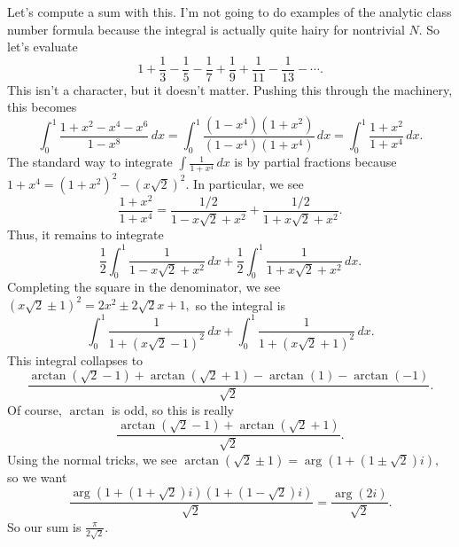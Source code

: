 Let's compute a sum with this. I'm not going to do examples of the analytic class number formula because the integral is actually quite hairy for nontrivial $N.$ So let's evaluate
\[1+\frac13-\frac15-\frac17+\frac19+\frac1{11}-\frac1{13}-\cdots.\]
This isn't a character, but it doesn't matter. Pushing this through the machinery, this becomes
\[\int_0^1\frac{1+x^2-x^4-x^6}{1-x^8}\,dx=\int_0^1\frac{\left(1-x^4\right)\left(1+x^2\right)}{\left(1-x^4\right)\left(1+x^4\right)}\,dx=\int_0^1\frac{1+x^2}{1+x^4}\,dx.\]
The standard way to integrate $\int\frac1{1+x^4}\,dx$ is by partial fractions because $1+x^4=\left(1+x^2\right)^2-\left(x\sqrt2\right)^2.$ In particular, we see
\[\frac{1+x^2}{1+x^4}=\frac{1/2}{1-x\sqrt2+x^2}+\frac{1/2}{1+x\sqrt2+x^2}.\]
Thus, it remains to integrate
\[\frac12\int_0^1\frac1{1-x\sqrt2+x^2}\,dx+\frac12\int_0^1\frac1{1+x\sqrt2+x^2}\,dx.\]
Completing the square in the denominator, we see $(x\sqrt2\pm1)^2=2x^2\pm2\sqrt2x+1,$ so the integral is
\[\int_0^1\frac1{1+(x\sqrt2-1)^2}\,dx+\int_0^1\frac1{1+(x\sqrt2+1)^2}\,dx.\]
This integral collapses to
\[\frac{\arctan(\sqrt2-1)+\arctan(\sqrt2+1)-\arctan(1)-\arctan(-1)}{\sqrt2}.\]
Of course, $\arctan$ is odd, so this is really
\[\frac{\arctan(\sqrt2-1)+\arctan(\sqrt2+1)}{\sqrt2}.\]
Using the normal tricks, we see $\arctan(\sqrt2\pm1)=\arg\left(1+(1\pm\sqrt2)i\right),$ so we want
\[\frac{\arg\left(1+(1+\sqrt2)i\right)\left(1+(1-\sqrt2)i\right)}{\sqrt2}=\frac{\arg(2i)}{\sqrt2}.\]
So our sum is $\boxed{\textstyle\frac{\pi}{2\sqrt2}}.$